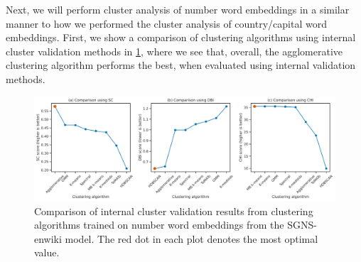 Next, we will perform cluster analysis of number word embeddings in a similar manner to how we performed the cluster analysis of country/capital word embeddings. First, we show a comparison of clustering algorithms using internal cluster validation methods in \cref{fig:cluster-analysis-numbers-word-group-internal-cluster-validation}, where we see that, overall, the agglomerative clustering algorithm performs the best, when evaluated using internal validation methods.
\begin{figure}[H]
    \centering
    \includegraphics[width=\textwidth]{thesis/figures/cluster-analysis-numbers-word-group-internal-cluster-validation.pdf}
    \caption{Comparison of internal cluster validation results from clustering algorithms trained on number word embeddings from the SGNS-enwiki model. The red dot in each plot denotes the most optimal value.}
    \label{fig:cluster-analysis-numbers-word-group-internal-cluster-validation}
\end{figure}

